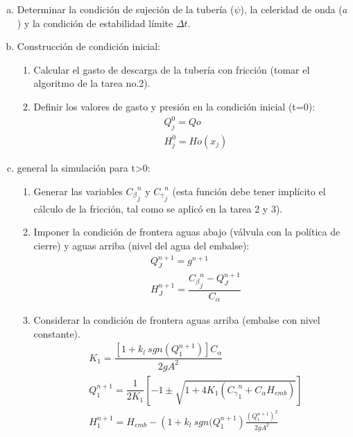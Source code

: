 \documentclass[letterpaper]{report}
\begin{document}
\begin{enumerate}[a)]
	\item Determinar la condición de sujeción de la tubería ($\psi$), la celeridad de onda ($a$) y la condición de estabilidad límite $\Delta t$.
	\item Construcción de condición inicial:
		\begin{enumerate}[1.]
			\item Calcular el gasto de descarga de la tubería con fricción (tomar el algoritmo de la tarea no.2).
			\item Definir los valores de gasto y presión en la condición inicial (t=0):\\
			\begin{equation*}
				\begin{aligned}
					&Q_j^0=Qo \\
					&H_j^0=Ho(x_j)
				\end{aligned}
			\end{equation*}
		\end{enumerate}
	\item general la simulación para t>0:
		\begin{enumerate}[1.]
		\item Generar las variables ${C_{\beta}}_j^n$ y ${C_\gamma}_j^n$ (esta función debe tener implícito el cálculo de la fricción, tal como se aplicó en la tarea 2 y 3).
		\item Imponer la condición de frontera aguas abajo (válvula con la política de cierre) y aguas arriba (nivel del agua del embalse):\\
			\begin{equation*}
				\begin{aligned}
					&Q_J^{n+1}=g^{n+1} \\
					&H_J^{n+1}=\dfrac{{C_\beta}_j^n-Q_J^{n+1}}{C_\alpha}
				\end{aligned}
			\end{equation*}
		\item Considerar la condición de frontera aguas arriba (embalse con nivel constante).
			\begin{equation*}
				\begin{aligned}
				&K_1=\dfrac{[1+k_l \ sgn(Q_1^{n+1})]C_\alpha}{2gA^2} \\
				&Q_1^{n+1}=\dfrac{1}{{2K}_1}\left[-1\pm\sqrt{1+{4K}_1\left({C_\gamma}_1^n+C_\alpha H_{emb}\right)}\right] \\
				&H_1^{n+1}=H_{emb}-\left(1+k_l \ sgn(Q_1^{n+1}\right)\frac{\left(Q_1^{n+1}\right)^2}{2gA^2}
				\end{aligned}
			\end{equation*}
		\end{enumerate}
\end{enumerate}
\end{document}
